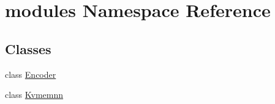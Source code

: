 \hypertarget{namespacemodules}{}\section{modules Namespace Reference}
\label{namespacemodules}
\subsection*{Classes}
\begin{DoxyCompactItemize}
\item 
class \hyperlink{classmodules_1_1Encoder}{Encoder}
\item 
class \hyperlink{classmodules_1_1Kvmemnn}{Kvmemnn}
\end{DoxyCompactItemize}
